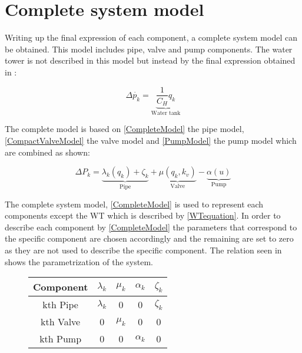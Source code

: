 \section{Complete system model} 
\label{CompleteSystemModel}

Writing up the final expression of each component, a complete system model can be obtained. This model includes pipe, valve and pump components. The water tower is not described in this model but instead by the final expression obtained in :

\begin{equation}
  \label{CompleteWTModel}
  \Delta \dot{p_k} = \underbrace{\frac{1}{C_H}q_k}_\text{Water tank} 
\end{equation}


 The complete model is based on \eqref{CompleteModel} the pipe model, \eqref{CompactValveModel} the valve model and \eqref{PumpModel} the pump model which are combined as shown:

\begin{equation}
  \label{CompleteModel}
  \Delta P_k = \underbrace{\lambda_k (q_k) + \zeta_k}_\text{Pipe} + \underbrace{\mu (q_k, k_v)}_\text{Valve} - \underbrace{\alpha (u)}_\text{Pump} 
\end{equation}



The complete system model, \eqref{CompleteModel} is used to represent each components except the WT which is described by \eqref{WTequation}. In order to describe each component by \eqref{CompleteModel} the parameters that correspond to the specific component are chosen accordingly and the remaining are set to zero as they are not used to describe the specific component. 
The relation seen in  shows the parametrization of the system.

\begin{figure}[H]
	\centering
\begin{tabular}{c|cccc} 
  			\bfseries Component    &     $\lambda_k$    &    $\mu_k$    &   $\alpha_k$    &  $\zeta_k$  		\\ \hline
			kth Pipe		  	   &     $\lambda_k$    &    0          &   0             &  $\zeta_k$   	    \\ 
			kth Valve              &     0              &    $\mu_k$    &   0 		      &  0    				\\ 
			kth Pump 		       &     0              &    0          &   $\alpha_k$    &  0    			    
\end{tabular}
		\label{tab:parametrization_model}

\end{figure}	

